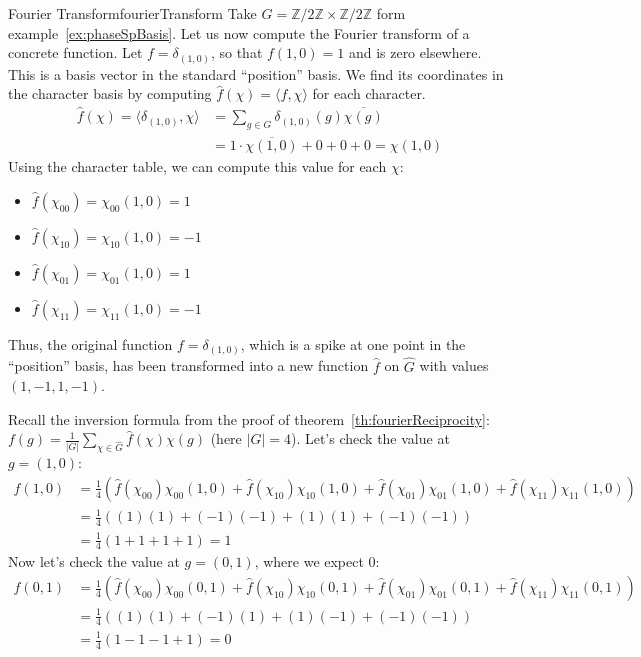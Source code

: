 \documentclass{article}
\newcommand{\Z}{{\mathbb{Z}}}
\begin{document}
\begin{example}{Fourier Transform}{fourierTransform}
	Take $G= \Z/2\Z\times \Z/2\Z$ form example~\ref{ex:phaseSpBasis}. Let us now compute the Fourier transform of a concrete function. Let $f = \delta_{(1,0)}$, so that $f(1,0) = 1$ and is zero elsewhere. This is a basis vector in the standard ``position'' basis. We find its coordinates in the character basis by computing $\hat{f}(\chi) = \langle f, \chi \rangle$ for each character.
\begin{align*}
	\hat{f}(\chi) = \langle \delta_{(1,0)}, \chi \rangle &= \sum_{g \in G} \delta_{(1,0)}(g)\overline{\chi(g)} \\
	&= 1 \cdot \overline{\chi(1,0)} + 0 + 0 + 0 = \chi(1,0)
\end{align*}
Using the character table, we can compute this value for each $\chi$:
\begin{itemize}
	\item $\hat{f}(\chi_{00}) = \chi_{00}(1,0) = 1$
	\item $\hat{f}(\chi_{10}) = \chi_{10}(1,0) = -1$
	\item $\hat{f}(\chi_{01}) = \chi_{01}(1,0) = 1$
	\item $\hat{f}(\chi_{11}) = \chi_{11}(1,0) = -1$
\end{itemize}
Thus, the original function $f = \delta_{(1,0)}$, which is a spike at one point in the ``position'' basis, has been transformed into a new function $\hat{f}$ on $\hat{G}$ with values $(1, -1, 1, -1)$.

Recall the inversion formula from the proof of theorem~\ref{th:fourierReciprocity}: $f(g) = \frac{1}{|G|}\sum_{\chi
\in \hat{G}}\hat{f}(\chi)\chi(g)$ (here $|G|=4$). Let's check the value at $g=(1,0)$:
\begin{align*}
	f(1,0) &= \frac{1}{4}\left( \hat{f}(\chi_{00})\chi_{00}(1,0) + \hat{f}(\chi_{10})\chi_{10}(1,0) + \hat{f}(\chi_{01})\chi_{01}(1,0) + \hat{f}(\chi_{11})\chi_{11}(1,0) \right) \\
	&= \frac{1}{4}\left( (1)(1) + (-1)(-1) + (1)(1) + (-1)(-1) \right) \\
	&= \frac{1}{4}(1 + 1 + 1 + 1) = 1
\end{align*}
Now let's check the value at $g=(0,1)$, where we expect 0:
\begin{align*}
	f(0,1) &= \frac{1}{4}\left( \hat{f}(\chi_{00})\chi_{00}(0,1) + \hat{f}(\chi_{10})\chi_{10}(0,1) + \hat{f}(\chi_{01})\chi_{01}(0,1) + \hat{f}(\chi_{11})\chi_{11}(0,1) \right) \\
	&= \frac{1}{4}\left( (1)(1) + (-1)(1) + (1)(-1) + (-1)(-1) \right) \\
	&= \frac{1}{4}(1 - 1 - 1 + 1) = 0
\end{align*}
\end{example}
\end{document}
